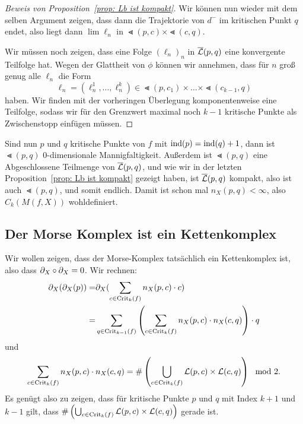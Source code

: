 \begin{proof}[Beweis von Proposition~\ref{prop: Lb ist kompakt}]
    Wir können nun wieder mit dem selben Argument zeigen, dass dann die Trajektorie von $d^-$ im
    kritischen Punkt $q$ endet, also liegt dann $\lim \ell_n$ in $\Lt (p, c) \times \Lt (c, q)$.

    Wir müssen noch zeigen, dass eine Folge $(\ell_n)_n$ in ${\overline{\mathcal{L}} } (p, q)$ eine konvergente 
    Teilfolge hat. Wegen der Glattheit von $\phi$ können wir annehmen, dass für $n$ groß 
    genug alle $\ell_n$ die Form 
    \[ \ell_n = (\ell^1_n, \dots, \ell^k_n) \in \Lt (p, c_1) \times \dots \times \Lt (c_{k - 1}, q) \]
    haben. Wir finden mit der vorheringen Überlegung komponentenweise eine Teilfolge, sodass wir 
    für den Grenzwert maximal noch $k - 1$ kritische Punkte als \glqq Zwischenstopp\grqq{} einfügen
    müssen. 
\end{proof}

\begin{remark}
    Sind nun $p$ und $q$ kritische Punkte von $f$ mit ${ \operatorname{ind} } (p) = { \operatorname{ind} } (q) + 1$, dann ist 
    $\Lt(p, q)$ $0$-dimensionale Mannigfaltigkeit. Außerdem ist $\Lt (p, q)$ eine Abgeschlossene
    Teilmenge von ${\overline{\mathcal{L}} } (p, q)$, und wie wir in der letzten Proposition~\ref{prop: Lb ist kompakt}
    gezeigt haben, ist ${\overline{\mathcal{L}} }(p, q)$ kompakt, also ist auch $\Lt(p, q)$, und somit endlich.
    Damit ist schon mal $n_X (p, q)< \infty$, also $C_k(M (f, X))$ wohldefiniert.
\end{remark}

\subsection*{Der Morse Komplex ist ein Kettenkomplex}

Wir wollen zeigen, dass der Morse-Komplex tatsächlich ein Kettenkomplex ist, also dass 
${ \partial }_X \circ { \partial }_X = 0$.
Wir rechnen:
\begin{align*}
    { \partial }_X ({ \partial }_X (p)) = & { \partial }_X (\sum_{c \in { \operatorname{Crit} }_k (f)} n_X (p, c) \cdot c) \\
    = & \sum_{q \in { \operatorname{Crit} }_{k - 1}(f)} \left( 
        \sum_{c \in { \operatorname{Crit} }_k (f)} n_X(p, c) \cdot n_X(c, q) \right) \cdot q
\end{align*}
und 
\[ \sum_{c \in { \operatorname{Crit} }_k (f)} n_X(p, c) \cdot n_X(c, q) = 
\# \left( \bigcup_{c \in { \operatorname{Crit} }_k (f)} { \mathcal{L} } (p, c) \times { \mathcal{L} } (c, q) \right) \mod 2 . \]
Es genügt also zu zeigen, dass für kritische Punkte $p$ und $q$ mit Index $k + 1$ und $k - 1$
gilt, dass $\# \left( \bigcup_{c \in { \operatorname{Crit} }_k (f)} { \mathcal{L} } (p, c) \times { \mathcal{L} } (c, q) \right)$ gerade ist.

